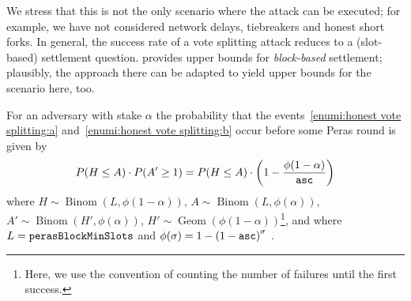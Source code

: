We stress that this is not the only scenario where the attack can be executed; for example, we have not considered network delays, tiebreakers and honest short forks.
In general, the success rate of a vote splitting attack reduces to a (slot-based) settlement question. \Cite{gavzi2023practical} provides upper bounds for \emph{block-based} settlement; plausibly, the approach there can be adapted to yield upper bounds for the scenario here, too.

\begin{lemma}\label{lemma:honest vote splitting prob}
  For an adversary with stake $\alpha$ the probability that the events~\ref{enumi:honest vote splitting:a} and~\ref{enumi:honest vote splitting:b} occur before some Peras round is given by
  \[ P(H\le A) \cdot P(A' \ge 1) = P(H\le A) \cdot \left(1- \frac{\phi(1-\alpha)}{\mathtt{asc}}\right) \]
  where $H\sim\operatorname{Binom}(L,\phi(1-\alpha))$, $A\sim\operatorname{Binom}(L,\phi(\alpha))$, $A' \sim \operatorname{Binom}(H',\phi(\alpha))$, $H' \sim \operatorname{Geom}(\phi(1-\alpha))$\footnote{Here, we use the convention of counting the number of failures until the first success.}, and where $L= \mathtt{perasBlockMinSlots}$ and $\phi(\sigma) = 1-{(1-\mathtt{asc})}^\sigma$ \parencite[(1)]{david2018ouroboros}.
\end{lemma}
